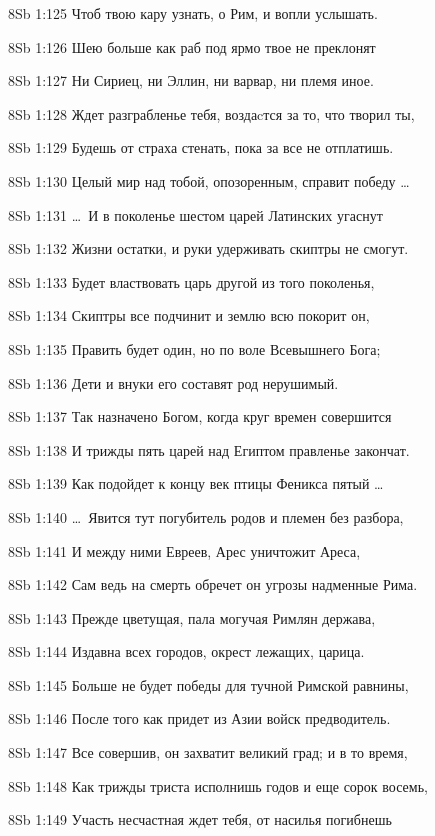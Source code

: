 \vs 8Sb 1:125 Чтоб твою кару узнать, о Рим, и вопли услышать. 

\vs 8Sb 1:126 Шею больше как раб под ярмо твое не преклонят 

\vs 8Sb 1:127 Ни Сириец, ни Эллин, ни варвар, ни племя иное. 

\vs 8Sb 1:128 Ждет разграбленье тебя, воздаcтся за то, что творил ты, 

\vs 8Sb 1:129 Будешь от страха стенать, пока за все не отплатишь.

\vs 8Sb 1:130 Целый мир над тобой, опозоренным, справит победу \ldots

\vs 8Sb 1:131 \ldots\ И в поколенье шестом царей Латинских угаснут 

\vs 8Sb 1:132 Жизни остатки, и руки удерживать скиптры не смогут. 

\vs 8Sb 1:133 Будет властвовать царь другой из того поколенья, 

\vs 8Sb 1:134 Скиптры все подчинит и землю всю покорит он, 

\vs 8Sb 1:135 Править будет один, но по воле Всевышнего Бога; 

\vs 8Sb 1:136 Дети и внуки его составят род нерушимый. 

\vs 8Sb 1:137 Так назначено Богом, когда круг времен совершится 

\vs 8Sb 1:138 И трижды пять царей над Египтом правленье закончат.

\vs 8Sb 1:139 Как подойдет к концу век птицы Феникса пятый \ldots

\vs 8Sb 1:140 \ldots\ Явится тут погубитель родов и племен без разбора, 

\vs 8Sb 1:141 И между ними  Евреев, Арес уничтожит Ареса, 

\vs 8Sb 1:142 Сам ведь на смерть обречет он угрозы надменные Рима. 

\vs 8Sb 1:143 Прежде цветущая, пала могучая Римлян держава, 

\vs 8Sb 1:144 Издавна всех городов, окрест лежащих, царица.

\vs 8Sb 1:145 Больше не будет победы для тучной Римской равнины, 

\vs 8Sb 1:146 После того как придет из Азии войск предводитель. 

\vs 8Sb 1:147 Все совершив, он захватит великий град; и в то время, 

\vs 8Sb 1:148 Как трижды триста исполнишь годов и еще сорок восемь, 

\vs 8Sb 1:149 Участь несчастная ждет тебя, от насилья погибнешь 

